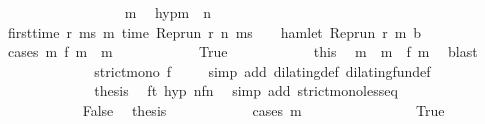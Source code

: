 \begin{isabellebody}
\ \ \ \ \ \ \isamarkupfalse%
\ {\isacharminus}\isanewline
\ \ \ \ \ \ \isacommand{{\isacharbraceleft}}\isamarkupfalse%
\ \isamarkupfalse%
\ m\ \isamarkupfalse%
\ hyp{\isacharcolon}{\isacartoucheopen}m\ {\isasymge}\ n{\isacartoucheclose}\isanewline
\ \ \ \ \ \ \ \ \isamarkupfalse%
\ {\isacartoucheopen}first{\isacharunderscore}time\ r\ ms\ m\ {\isacharparenleft}time\ {\isacharparenleft}Rep{\isacharunderscore}run\ r\ n\ ms{\isacharparenright}\ {\isacharplus}\ {\isasymdelta}{\isasymtau}{\isacharparenright}\ {\isasymlongrightarrow}\ hamlet\ {\isacharparenleft}Rep{\isacharunderscore}run\ r\ m\ b{\isacharparenright}{\isacartoucheclose}\isanewline
\ \ \ \ \ \ \ \ \isamarkupfalse%
\ {\isacharparenleft}cases\ {\isacartoucheopen}{\isasymexists}m\ f\ m\ {\isacharequal}\ m{\isacartoucheclose}{\isacharparenright}\isanewline
\ \ \ \ \ \ \ \ \ \ \isamarkupfalse%
\ True\isanewline
\ \ \ \ \ \ \ \ \ \ \isamarkupfalse%
\ this\ \isamarkupfalse%
\ m\ \ {\isacartoucheopen}m\ {\isacharequal}\ f\ m\ \isamarkupfalse%
\ blast\isanewline
\ \ \ \ \ \ \ \ \ \ \isamarkupfalse%
\ \isamarkupfalse%
\ {\isacartoucheopen}strict{\isacharunderscore}mono\ f{\isacartoucheclose}\ \isamarkupfalse%
\ {\isacharasterisk}\ \isamarkupfalse%
\ {\isacharparenleft}simp\ add{\isacharcolon}\ dilating{\isacharunderscore}def\ dilating{\isacharunderscore}fun{\isacharunderscore}def{\isacharparenright}\isanewline
\ \ \ \ \ \ \ \ \ \ \isamarkupfalse%
\ \isamarkupfalse%
\ {\isacharquery}thesis\ \isamarkupfalse%
\ ft{}\ hyp\ nfn{}\ \isamarkupfalse%
\ {\isacharparenleft}simp\ add{\isacharcolon}\ strict{\isacharunderscore}mono{\isacharunderscore}less{\isacharunderscore}eq{\isacharparenright}\isanewline
\ \ \ \ \ \ \ \ \isamarkupfalse%
\isanewline
\ \ \ \ \ \ \ \ \ \ \isamarkupfalse%
\ False\ \isamarkupfalse%
\ {\isacharquery}thesis\isanewline
\ \ \ \ \ \ \ \ \ \ \isamarkupfalse%
\ {\isacharparenleft}cases\ {\isacartoucheopen}m\ {\isacharequal}\ {}{\isacartoucheclose}{\isacharparenright}\isanewline
\ \ \ \ \ \ \ \ \ \ \ \ \isamarkupfalse%
\ True\isanewline

\end{isabellebody}
